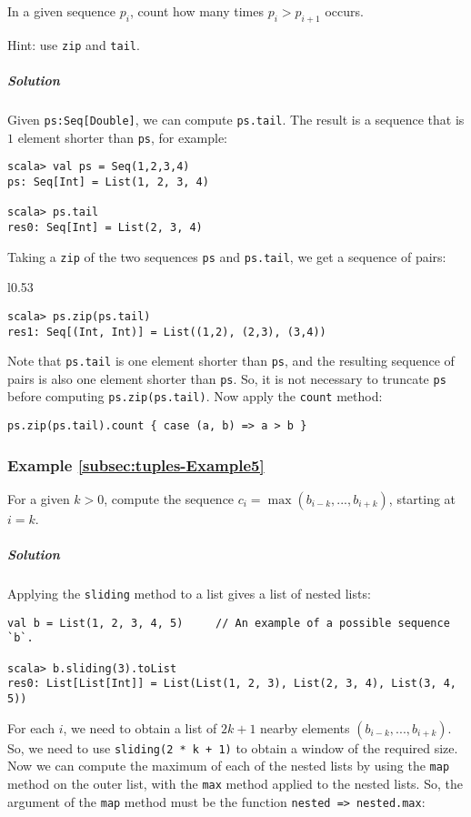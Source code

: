 In a given sequence $p_{i}$, count how many times $p_{i}>p_{i+1}$
occurs.

Hint: use \lstinline!zip! and \lstinline!tail!.

\subparagraph{Solution}

Given \lstinline!ps:Seq[Double]!, we can compute \lstinline!ps.tail!.
The result is a sequence that is $1$ element shorter than \lstinline!ps!,
for example:
\begin{lstlisting}
scala> val ps = Seq(1,2,3,4)
ps: Seq[Int] = List(1, 2, 3, 4)

scala> ps.tail
res0: Seq[Int] = List(2, 3, 4)
\end{lstlisting}
Taking a \lstinline!zip! of the two sequences \lstinline!ps! and
\lstinline!ps.tail!, we get a sequence of pairs:

\begin{wrapfigure}{l}{0.53\columnwidth}%
\vspace{-0.75\baselineskip}
\begin{lstlisting}
scala> ps.zip(ps.tail)
res1: Seq[(Int, Int)] = List((1,2), (2,3), (3,4))
\end{lstlisting}
\vspace{-1.5\baselineskip}
\end{wrapfigure}%

\noindent Note that \lstinline!ps.tail! is one element shorter than
\lstinline!ps!, and the resulting sequence of pairs is also one element
shorter than \lstinline!ps!. So, it is not necessary to truncate
\lstinline!ps! before computing \lstinline!ps.zip(ps.tail)!. Now
apply the \lstinline!count! method:

\begin{lstlisting}
ps.zip(ps.tail).count { case (a, b) => a > b }
\end{lstlisting}


\subsubsection{Example \label{subsec:tuples-Example5}\ref{subsec:tuples-Example5}}

For a given $k>0$, compute the sequence $c_{i}=\max(b_{i-k},...,b_{i+k})$,
starting at $i=k$.

\subparagraph{Solution}

Applying the \lstinline!sliding! method to a list gives a list of
nested lists:
\begin{lstlisting}
val b = List(1, 2, 3, 4, 5)     // An example of a possible sequence `b`.

scala> b.sliding(3).toList
res0: List[List[Int]] = List(List(1, 2, 3), List(2, 3, 4), List(3, 4, 5)) 
\end{lstlisting}
For each $i$, we need to obtain a list of $2k+1$ nearby elements
$\left(b_{i-k},...,b_{i+k}\right)$. So, we need to use \lstinline!sliding(2 * k + 1)!
to obtain a window of the required size. Now we can compute the maximum
of each of the nested lists by using the \lstinline!map! method on
the outer list, with the \lstinline!max! method applied to the nested
lists. So, the argument of the \lstinline!map! method must be the
function \lstinline!nested => nested.max!:

